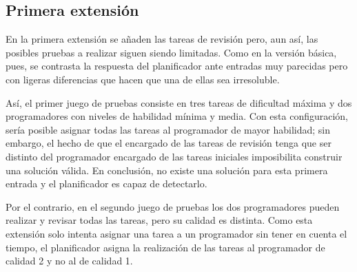 
\subsection{Primera extensión} \label{sec:res-ext1}

En la primera extensión se añaden las tareas de revisión pero, aun así, las 
posibles pruebas a realizar siguen siendo limitadas. Como en la versión 
básica, pues, se contrasta la respuesta del planificador ante entradas muy 
parecidas pero con ligeras diferencias que hacen que una de ellas sea 
irresoluble.

Así, el primer juego de pruebas consiste en tres tareas de dificultad máxima 
y dos programadores con niveles de habilidad mínima y media. Con esta 
configuración, sería posible asignar todas las tareas al programador de mayor 
habilidad; sin embargo, el hecho de que el encargado de las tareas de revisión 
tenga que ser distinto del programador encargado de las tareas iniciales 
imposibilita construir una solución válida. En conclusión, no existe una 
solución para esta primera entrada y el planificador es capaz de detectarlo.

Por el contrario, en el segundo juego de pruebas los dos programadores pueden
realizar y revisar todas las tareas, pero su calidad es distinta. 
Como esta extensión solo intenta asignar una tarea a un programador sin tener
en cuenta el tiempo, el planificador asigna la realización de las tareas al
programador de calidad 2 y no al de calidad 1.




